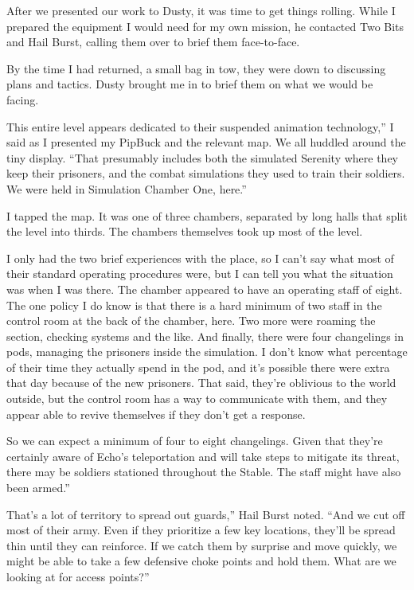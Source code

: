 After we presented our work to Dusty, it was time to get things rolling. While I prepared the equipment I would need for my own mission, he contacted Two Bits and Hail Burst, calling them over to brief them face-to-face.

By the time I had returned, a small bag in tow, they were down to discussing plans and tactics. Dusty brought me in to brief them on what we would be facing.

\leavevmode{}This entire level appears dedicated to their suspended animation technology,” I said as I presented my PipBuck and the relevant map. We all huddled around the tiny display. “That presumably includes both the simulated Serenity where they keep their prisoners, and the combat simulations they used to train their soldiers. We were held in Simulation Chamber One, here.”

I tapped the map. It was one of three chambers, separated by long halls that split the level into thirds. The chambers themselves took up most of the level.

\leavevmode{}I only had the two brief experiences with the place, so I can’t say what most of their standard operating procedures were, but I can tell you what the situation was when I was there. The chamber appeared to have an operating staff of eight. The one policy I do know is that there is a hard minimum of two staff in the control room at the back of the chamber, here. Two more were roaming the section, checking systems and the like. And finally, there were four changelings in pods, managing the prisoners inside the simulation. I don’t know what percentage of their time they actually spend in the pod, and it’s possible there were extra that day because of the new prisoners. That said, they’re oblivious to the world outside, but the control room has a way to communicate with them, and they appear able to revive themselves if they don’t get a response.

\leavevmode{}So we can expect a minimum of four to eight changelings. Given that they’re certainly aware of Echo’s teleportation and will take steps to mitigate its threat, there may be soldiers stationed throughout the Stable. The staff might have also been armed.”

\leavevmode{}That’s a lot of territory to spread out guards,” Hail Burst noted. “And we cut off most of their army. Even if they prioritize a few key locations, they’ll be spread thin until they can reinforce. If we catch them by surprise and move quickly, we might be able to take a few defensive choke points and hold them. What are we looking at for access points?”

